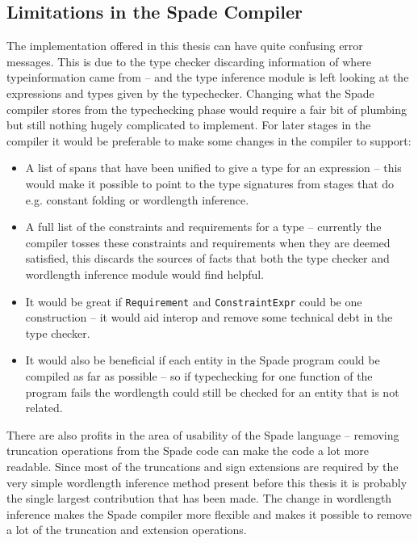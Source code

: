 \subsection{Limitations in the Spade Compiler}
The implementation offered in this thesis can have quite confusing error messages. This is due to the type checker discarding information of where typeinformation came from -- and the type inference module is left looking at the expressions and types given by the typechecker. Changing what the Spade compiler stores from the typechecking phase would require a fair bit of plumbing but still nothing hugely complicated to implement. For later stages in the compiler it would be preferable to make some changes in the compiler to support:
\begin{itemize}
  \item A list of spans that have been unified to give a type for an expression -- this would make it possible to point to the type signatures from stages that do e.g. constant folding or wordlength inference.
  \item A full list of the constraints and requirements for a type -- currently the compiler tosses these constraints and requirements when they are deemed satisfied, this discards the sources of facts that both the type checker and wordlength inference module would find helpful.
  \item It would be great if \verb+Requirement+ and \verb+ConstraintExpr+ could be one construction -- it would aid interop and remove some technical debt in the type checker.
  \item It would also be beneficial if each entity in the Spade program could be compiled as far as possible -- so if typechecking for one function of the program fails the wordlength could still be checked for an entity that is not related.
\end{itemize}

There are also profits in the area of usability of the Spade language -- removing truncation operations from the Spade code can make the code a lot more readable. Since most of the truncations and sign extensions are required by the very simple wordlength inference method present before this thesis it is probably the single largest contribution that has been made. The change in wordlength inference makes the Spade compiler more flexible and makes it possible to remove a lot of the truncation and extension operations.

